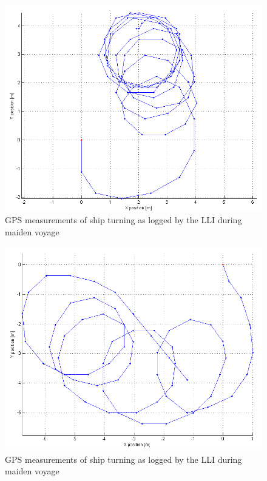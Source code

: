 \begin{figure}[htpb]
	\centering
	\includegraphics[width=\textwidth]{img/maidenVoyage/ship_turning2}
	\caption{GPS measurements of ship turning as logged by the LLI during maiden voyage} 
	\label{fig:ship_turning2}
\end{figure}

\begin{figure}[htpb]
	\centering
	\includegraphics[width=\textwidth]{img/maidenVoyage/ship_turning}
	\caption{GPS measurements of ship turning as logged by the LLI during maiden voyage} 
	\label{fig:ship_turning}  
\end{figure}

